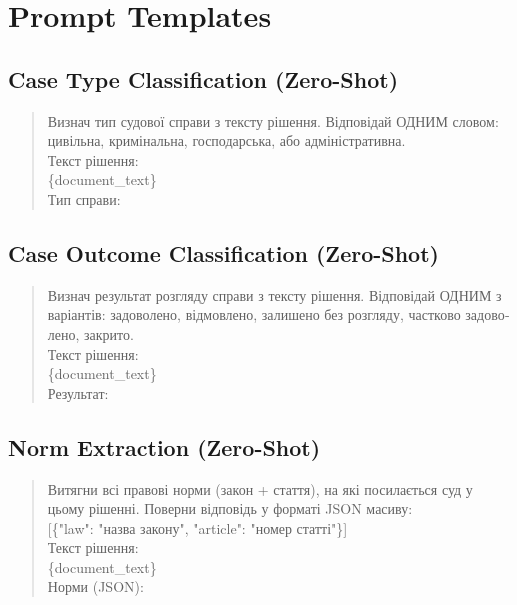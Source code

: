 \documentclass[11pt,a4paper]{article}
\begin{document}
\appendix

\section{Prompt Templates}
\label{app:prompts}

\subsection{Case Type Classification (Zero-Shot)}

\begin{quote}\small\ttfamily
\foreignlanguage{ukrainian}{Визнач тип судової справи з тексту рішення.
Відповідай ОДНИМ словом: цивільна, кримінальна,
господарська, або адміністративна.}\\[6pt]
\foreignlanguage{ukrainian}{Текст рішення:}\\
\{document\_text\}\\[6pt]
\foreignlanguage{ukrainian}{Тип справи:}
\end{quote}

\subsection{Case Outcome Classification (Zero-Shot)}

\begin{quote}\small\ttfamily
\foreignlanguage{ukrainian}{Визнач результат розгляду справи з тексту рішення.
Відповідай ОДНИМ з варіантів: задоволено, відмовлено,
залишено без розгляду, частково задоволено, закрито.}\\[6pt]
\foreignlanguage{ukrainian}{Текст рішення:}\\
\{document\_text\}\\[6pt]
\foreignlanguage{ukrainian}{Результат:}
\end{quote}

\subsection{Norm Extraction (Zero-Shot)}

\begin{quote}\small\ttfamily
\foreignlanguage{ukrainian}{Витягни всі правові норми (закон + стаття),
на які посилається суд у цьому рішенні.
Поверни відповідь у форматі JSON масиву:}\\
{[}\{"law": "\foreignlanguage{ukrainian}{назва закону}", "article": "\foreignlanguage{ukrainian}{номер статті}"\}{]}\\[6pt]
\foreignlanguage{ukrainian}{Текст рішення:}\\
\{document\_text\}\\[6pt]
\foreignlanguage{ukrainian}{Норми (JSON):}
\end{quote}
\end{document}
